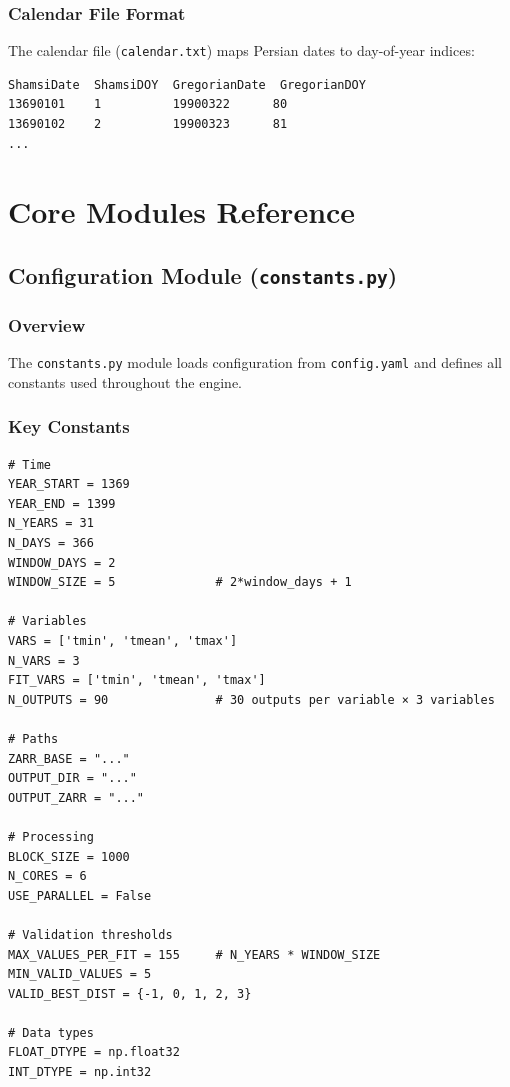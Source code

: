 ﻿\documentclass[12pt,a4paper]{report}
\begin{document}
\subsection{Calendar File Format}
The calendar file (\texttt{calendar.txt}) maps Persian dates to day-of-year indices:
\begin{lstlisting}[caption=calendar.txt Format]
ShamsiDate  ShamsiDOY  GregorianDate  GregorianDOY
13690101    1          19900322      80
13690102    2          19900323      81
...
\end{lstlisting}

\chapter{Core Modules Reference}

\section{Configuration Module (\texttt{constants.py})}
\subsection{Overview}
The \texttt{constants.py} module loads configuration from \texttt{config.yaml} and defines all constants used throughout the engine.

\subsection{Key Constants}
\begin{lstlisting}[caption=Constants Defined]
# Time
YEAR_START = 1369
YEAR_END = 1399
N_YEARS = 31
N_DAYS = 366
WINDOW_DAYS = 2
WINDOW_SIZE = 5              # 2*window_days + 1

# Variables
VARS = ['tmin', 'tmean', 'tmax']
N_VARS = 3
FIT_VARS = ['tmin', 'tmean', 'tmax']
N_OUTPUTS = 90               # 30 outputs per variable × 3 variables

# Paths
ZARR_BASE = "..."
OUTPUT_DIR = "..."
OUTPUT_ZARR = "..."

# Processing
BLOCK_SIZE = 1000
N_CORES = 6
USE_PARALLEL = False

# Validation thresholds
MAX_VALUES_PER_FIT = 155     # N_YEARS * WINDOW_SIZE
MIN_VALID_VALUES = 5
VALID_BEST_DIST = {-1, 0, 1, 2, 3}

# Data types
FLOAT_DTYPE = np.float32
INT_DTYPE = np.int32
\end{lstlisting}
\end{document}
